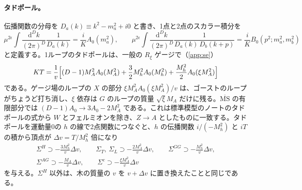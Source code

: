 \documentclass[a4paper,10pt]{ltjsarticle}
\newcommand{\dd}{\mathrm{d}}
\newcommand{\MSbar}{\overline{\mathrm{MS}}}
\begin{document}
\paragraph{タドポール。}伝播関数の分母を $D_a(k)\equiv k^2-m_a^2+i0$ と書き、1点と2点のスカラー積分を
\begin{equation}
\mu^{2\epsilon}\int\frac{\dd^Dk}{(2\pi)^D}\frac{1}{D_a(k)}=\frac iKA_0(m_a^2),\qquad
\mu^{2\epsilon}\int\frac{\dd^Dk}{(2\pi)^D}\frac{1}{D_a(k)\,D_b(k+p)}=\frac iKB_0(p^2;m_a^2,m_b^2)
\label{eq:IN}
\end{equation}
と定義する。1ループのタドポールは、一般の $R_\xi$ ゲージで（\ref{app:se}）
\begin{equation}
KT=\frac1v\Bigl[(D-1)M_A^2A_0(M_A^2)+\frac32M_h^2A_0(M_h^2)+\frac{M_h^2}2A_0(\xi M_A^2)\Bigr]
\label{eq:T}
\end{equation}
である。ゲージ場のループの $X$ の部分 $\xi M_A^2A_0(\xi M_A^2)/v$ は、ゴーストのループがちょうど打ち消し、$\xi$ 依存は $G$ のループの質量 $\sqrt\xi M_A$ だけに残る。$\MSbar$ の有限部分では $(D-1)A_0\to3A_0-2M_A^2$ である。これは標準模型のノートのタドポールの式から $W$ とフェルミオンを除き、$Z\to A$ としたものに一致する。タドポールを運動量0の $h$ の線で2点関数につなぐと、$h$ の伝播関数 $i/(-M_h^2)$ と $iT$ の積から頂点が $\Delta v=T/M_h^2$ 倍になり
\begin{equation}
\begin{gathered}
\Sigma^H\supset-\frac{3M_h^2}v\Delta v,\qquad
\Sigma_T,\ \Sigma_L\supset-\frac{2M_A^2}v\Delta v,\qquad
\Sigma^{GG}\supset-\frac{M_h^2}v\Delta v,\\
\Sigma^{AG}\supset-\frac{M_A}v\Delta v,\qquad
\Sigma^c\supset-\frac{\xi M_A^2}v\Delta v
\end{gathered}
\label{eq:tadins}
\end{equation}
を与える。$\Sigma^H$ 以外は、木の質量の $v$ を $v+\Delta v$ に置き換えたことと同じである。
\end{document}
